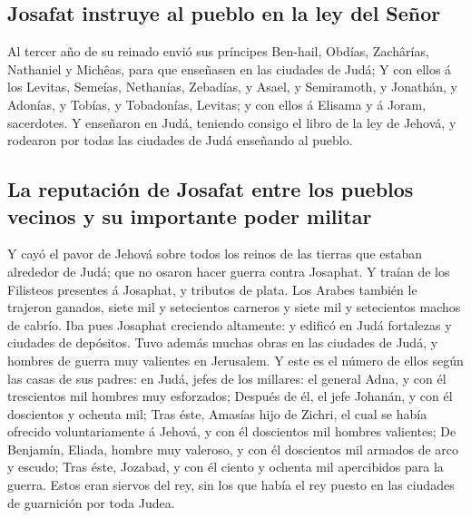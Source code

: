 \hypertarget{josafat-instruye-al-pueblo-en-la-ley-del-seuxf1or}{%
\subsection{Josafat instruye al pueblo en la ley del
Señor}\label{josafat-instruye-al-pueblo-en-la-ley-del-seuxf1or}}

 Al tercer año de su reinado envió sus príncipes Ben-hail,
Obdías, Zachârías, Nathaniel y Michêas, para que enseñasen en las
ciudades de Judá;  Y con ellos á los Levitas, Semeías,
Nethanías, Zebadías, y Asael, y Semiramoth, y Jonathán, y Adonías, y
Tobías, y Tobadonías, Levitas; y con ellos á Elisama y á Joram,
sacerdotes.  Y enseñaron en Judá, teniendo consigo el libro
de la ley de Jehová, y rodearon por todas las ciudades de Judá enseñando
al pueblo.

\hypertarget{la-reputaciuxf3n-de-josafat-entre-los-pueblos-vecinos-y-su-importante-poder-militar}{%
\subsection{La reputación de Josafat entre los pueblos vecinos y su
importante poder
militar}\label{la-reputaciuxf3n-de-josafat-entre-los-pueblos-vecinos-y-su-importante-poder-militar}}

 Y cayó el pavor de Jehová sobre todos los reinos de las
tierras que estaban alrededor de Judá; que no osaron hacer guerra contra
Josaphat.  Y traían de los Filisteos presentes á Josaphat,
y tributos de plata. Los Arabes también le trajeron ganados, siete mil y
setecientos carneros y siete mil y setecientos machos de cabrío.
 Iba pues Josaphat creciendo altamente: y edificó en Judá
fortalezas y ciudades de depósitos.  Tuvo además muchas
obras en las ciudades de Judá, y hombres de guerra muy valientes en
Jerusalem.  Y este es el número de ellos según las casas de
sus padres: en Judá, jefes de los millares: el general Adna, y con él
trescientos mil hombres muy esforzados;  Después de él, el
jefe Johanán, y con él doscientos y ochenta mil;  Tras
éste, Amasías hijo de Zichri, el cual se había ofrecido voluntariamente
á Jehová, y con él doscientos mil hombres valientes;  De
Benjamín, Eliada, hombre muy valeroso, y con él doscientos mil armados
de arco y escudo;  Tras éste, Jozabad, y con él ciento y
ochenta mil apercibidos para la guerra.  Estos eran siervos
del rey, sin los que había el rey puesto en las ciudades de guarnición
por toda Judea.


